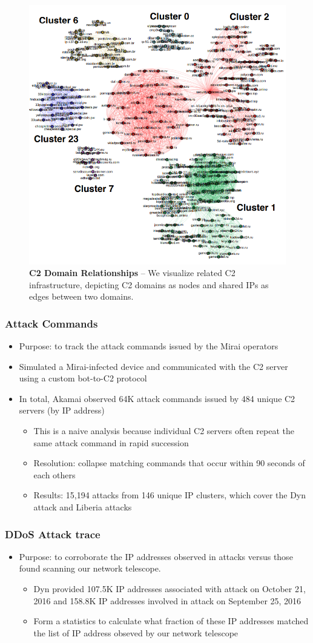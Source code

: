 \documentclass{beamer}
\begin{document}
\begin{frame}
	\begin{figure}
		\includegraphics[width=50 mm, scale = 0.5]{C2DomainRelationship.png}
		\caption{ \textbf{C2 Domain Relationships} -- We visualize related C2 infrastructure, depicting C2 domains as nodes and shared IPs as edges between two domains.}
	\end{figure}
\end{frame}

\begin{frame}
	\frametitle{Attack Commands}
	\begin{itemize}
		\item<+-> Purpose: to track the attack commands issued by the Mirai operators
		\item<+-> Simulated a Mirai-infected device and communicated with the C2 server using a custom bot-to-C2 protocol
		\item<+-> In total, Akamai observed 64K attack commands issued by 484 unique C2 servers  (by IP address)
		\begin{itemize}
			\item<+-> This is a naive analysis because individual C2 servers often repeat the same attack command in rapid succession
			\item<+-> Resolution: collapse matching commands that occur within 90 seconds of each others
			\item<+-> Results: 15,194 attacks from 146 unique IP clusters, which cover the Dyn attack and Liberia attacks
		\end{itemize}
	\end{itemize}
\end{frame}

\begin{frame}
	\frametitle{DDoS Attack trace}
	\begin{itemize}
		\item<+-> Purpose: to corroborate the IP addresses observed in attacks versus those found scanning our network telescope.
		\begin{itemize}
			\item<+-> Dyn provided 107.5K IP addresses associated
with attack on October 21, 2016 and 158.8K IP addresses involved in attack on September 25, 2016
			\item<+-> Form a statistics to calculate what fraction of these IP addresses matched the list of IP address obseved by our network telescope
		\end{itemize}
	\end{itemize}
\end{frame}
\end{document}

